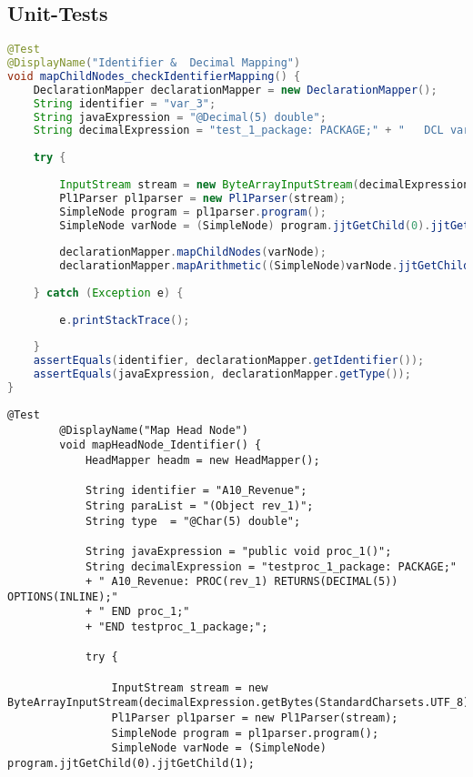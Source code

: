 
\begin{appendices}

\begingroup

\section{Unit-Tests}\label{lst:tests}


\begin{lstlisting}[language=Java, caption=Deklaration-Test]
@Test
@DisplayName("Identifier &  Decimal Mapping")
void mapChildNodes_checkIdentifierMapping() {
	DeclarationMapper declarationMapper = new DeclarationMapper();
	String identifier = "var_3";
	String javaExpression = "@Decimal(5) double";
	String decimalExpression = "test_1_package: PACKAGE;" + "	DCL var_3 FIXED DECIMAL(5)" + "END test_1_package;";
	
	try {
		
		InputStream stream = new ByteArrayInputStream(decimalExpression.getBytes(StandardCharsets.UTF_8));
		Pl1Parser pl1parser = new Pl1Parser(stream);
		SimpleNode program = pl1parser.program();
		SimpleNode varNode = (SimpleNode) program.jjtGetChild(0).jjtGetChild(1);
		
		declarationMapper.mapChildNodes(varNode);
		declarationMapper.mapArithmetic((SimpleNode)varNode.jjtGetChild(1).jjtGetChild(0));
		
	} catch (Exception e) {
		
		e.printStackTrace();
		
	}
	assertEquals(identifier, declarationMapper.getIdentifier());
	assertEquals(javaExpression, declarationMapper.getType());
}		
\end{lstlisting}
\pagebreak

	\begin{lstlisting}[language=PL/I, caption=Proc-Head Test]
		@Test
		@DisplayName("Map Head Node")
		void mapHeadNode_Identifier() {
			HeadMapper headm = new HeadMapper();
			
			String identifier = "A10_Revenue";
			String paraList = "(Object rev_1)";
			String type  = "@Char(5) double";
			
			String javaExpression = "public void proc_1()";
			String decimalExpression = "testproc_1_package: PACKAGE;" 
			+ "	A10_Revenue: PROC(rev_1) RETURNS(DECIMAL(5)) OPTIONS(INLINE);"
			+ "	END proc_1;" 
			+ "END testproc_1_package;";
			
			try {
				
				InputStream stream = new ByteArrayInputStream(decimalExpression.getBytes(StandardCharsets.UTF_8));
				Pl1Parser pl1parser = new Pl1Parser(stream);
				SimpleNode program = pl1parser.program();
				SimpleNode varNode = (SimpleNode) program.jjtGetChild(0).jjtGetChild(1);
				

\end{lstlisting}
\end{appendices}
